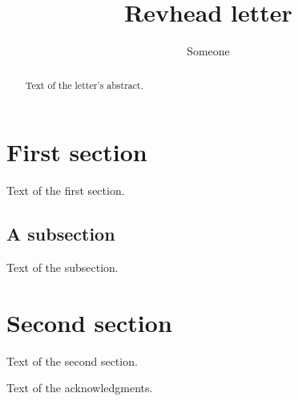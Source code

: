 \documentclass[aps,prl,twocolumn,reprint]{revtex4-2}
\begin{document}
\title{Revhead letter}
\author{Someone}
\begin{abstract}
Text of the letter's abstract.
\end{abstract}
\maketitle
\section{First section}
Text of the first section.
\subsection{A subsection}
Text of the subsection.
\section{Second section}
Text of the second section.
\begin{acknowledgments}
Text of the acknowledgments.
\end{acknowledgments}
\end{document}
